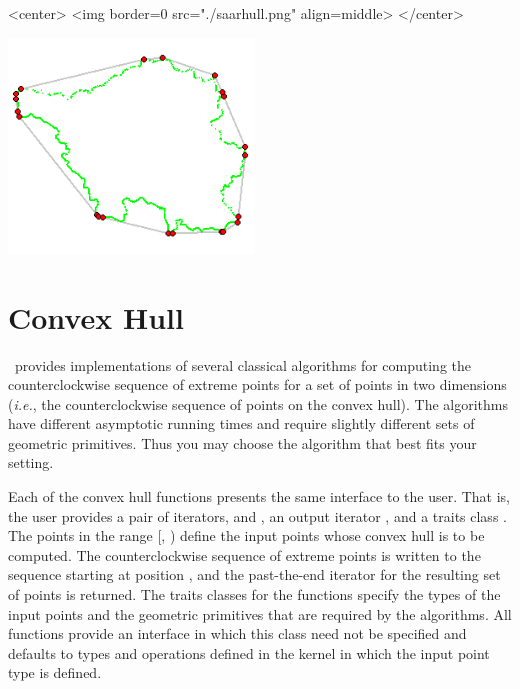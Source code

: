 \begin{ccHtmlOnly}
<center>
<img border=0 src="./saarhull.png" align=middle>
</center>
\end{ccHtmlOnly} 

\begin{ccTexOnly}
\begin{center}
\includegraphics[width=6.5cm]{Convex_hull_2/saarhull}
\end{center}
\end{ccTexOnly}

\section{Convex Hull\label{sec:convex_hull_2}}
\cgal\ provides implementations of several classical algorithms for
computing the counterclockwise sequence of extreme points for a set of 
points in two dimensions (\textit{i.e.}, the counterclockwise sequence 
of points on the convex hull).  The algorithms have different asymptotic
running times and require slightly different sets of geometric primitives. 
Thus you may choose the algorithm that best fits your setting.

Each of the convex hull functions presents the same interface to the
user.  That is, the user provides a pair of iterators, 
and , an output iterator ,  and a traits class
. The points in the range [, ) define
the input points whose convex hull is to be computed.  The counterclockwise
sequence of extreme points is written to the sequence starting at position
, and the past-the-end iterator for the resulting set of
points is returned.  The traits classes for the functions specify the types
of the input points and the geometric primitives that are required by
the algorithms. All functions provide an interface in which this
class need not be specified and defaults to types and operations defined
in the kernel in which the input point type is defined.

